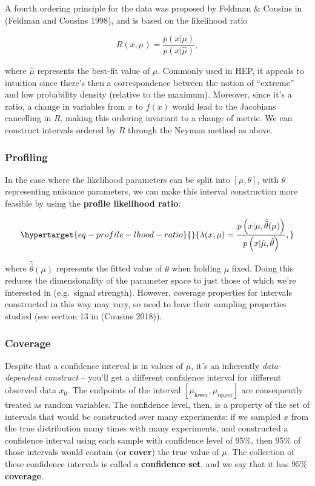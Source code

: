 \documentclass[
  11pt,
  numbers=noendperiod]{book}
\begin{document}
A fourth ordering principle for the data was proposed by Feldman \&
Cousins in (Feldman and Cousins 1998), and is based on the likelihood
ratio

\[ R(x, \mu) = \frac{p(x|\mu)}{p(x| \hat{\mu})} ,\]

where \(\hat{\mu}\) represents the best-fit value of \(\mu\). Commonly
used in HEP, it appeals to intuition since there's then a correspondence
between the notion of ``extreme'' and low probability density (relative
to the maximum). Moreover, since it's a ratio, a change in variables
from \(x\) to \(f(x)\) would lead to the Jacobians cancelling in \(R\),
making this ordering invariant to a change of metric. We can construct
intervals ordered by \(R\) through the Neyman method as above.

\hypertarget{profiling}{%
\subsubsection*{Profiling}\label{profiling}}

In the case where the likelihood parameters can be split into
\([\mu, \theta]\), with \(\theta\) representing nuisance parameters, we
can make this interval construction more feasible by using the
\textbf{profile likelihood ratio}:

\begin{equation}\protect\hypertarget{eq-profile-lhood-ratio}{}{
\lambda(x, \mu) = \frac{p\left(x|\mu,\hat{\hat{\theta}}(\mu)\right)}{p\left(x| \hat{\mu}, \hat{\theta}\right)},
}\label{eq-profile-lhood-ratio}\end{equation}

where \(\hat{\hat{\theta}}(\mu)\) represents the fitted value of
\(\theta\) when holding \(\mu\) fixed. Doing this reduces the
dimensionality of the parameter space to just those of which we're
interested in (e.g.~signal strength). However, coverage properties for
intervals constructed in this way may vary, so need to have their
sampling properties studied (see section 13 in (Cousins 2018)).

\hypertarget{coverage}{%
\subsubsection*{Coverage}\label{coverage}}

Despite that a confidence interval is in values of \(\mu\), it's an
inherently \emph{data-dependent construct} -- you'll get a different
confidence interval for different observed data \(x_0\). The endpoints
of the interval \([\mu_{\mathrm{lower}}, \mu_{\mathrm{upper}}]\) are
consequently treated as random variables. The confidence level, then, is
a property of the set of intervals that would be constructed over many
experiments: if we sampled \(x\) from the true distribution many times
with many experiments, and constructed a confidence interval using each
sample with confidence level of 95\%, then 95\% of those intervals would
contain (or \textbf{cover}) the true value of \(\mu\). The collection of
these confidence intervals is called a \textbf{confidence set}, and we
say that it has 95\% \textbf{coverage}.
\end{document}
